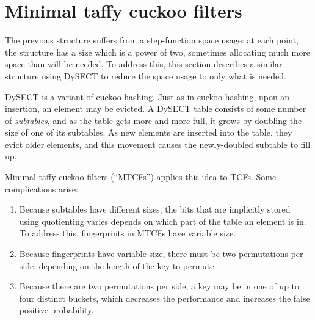 \documentclass[sigconf, nonacm]{acmart}
\begin{document}


\section{Minimal taffy cuckoo filters}
\label{mtcf}

The previous structure suffers from a step-function space usage:
at each point, the structure has a size which is a power of two, sometimes allocating much more space than will be needed.
To address this, this section describes a similar structure using DySECT to reduce the space usage to only what is needed.~\cite{dysect}

DySECT is a variant of cuckoo hashing.
Just as in cuckoo hashing, upon an insertion, an element may be evicted.
A DySECT table consists of some number of {\em subtables}, and as the table gets more and more full, it grows by doubling the size of one of its subtables.
As new elements are inserted into the table, they evict older elements, and this movement causes the newly-doubled subtable to fill up.

Minimal taffy cuckoo filters (``MTCFs'') applies this idea to TCFs.
Some complications arise:

\begin{enumerate}
  \item Because subtables have different sizes, the bits that are implicitly stored using quotienting varies depends on which part of the table an element is in.
    To address this, fingerprints in MTCFs have variable size.
  \item Because fingerprints have variable size, there must be two permutations per side, depending on the length of the key to permute.
  \item Because there are two permutations per side, a key may be in one of up to four distinct buckets, which decreases the performance and increases the false positive probability.
\end{enumerate}
\end{document}
